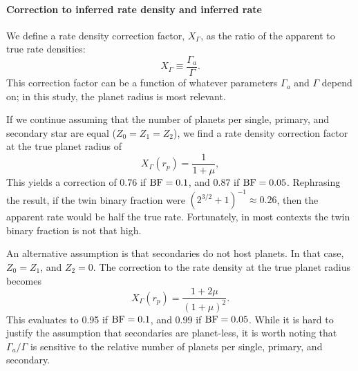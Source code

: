 \paragraph{Correction to inferred rate density and inferred rate}

We define a rate density correction factor, $X_\Gamma$, as the ratio of the 
apparent to true rate densities:
\begin{equation}
X_\Gamma \equiv \frac{\Gamma_a}{\Gamma}.
\end{equation}
This correction factor can be a function of whatever parameters $\Gamma_a$ and 
$\Gamma$ depend on; in this study, the planet radius is most relevant.

If we continue assuming that the number of planets per single, primary, and 
secondary star are equal ($Z_0=Z_1=Z_2$), we find a rate density correction 
factor at the true planet radius of
\begin{equation}
X_\Gamma(r_p) = \frac{1}{1+\mu},
\label{eq:Z_eq_model_1_correction}
\end{equation}
This yields a correction of 0.76 if ${\rm BF}=0.1$, and 0.87 if ${\rm 
BF}=0.05$.
Rephrasing the result, if the twin binary fraction were 
$(2^{3/2}+1)^{-1}\approx 0.26$, then the apparent rate would be half the true 
rate.
Fortunately, in most contexts the twin binary fraction is not that high.

An alternative assumption is that secondaries do not host planets. In that 
case, $Z_0=Z_1$, and $Z_2=0$. The correction to the rate density at the true 
planet radius becomes
\begin{equation}
X_\Gamma(r_p) = \frac{1+2\mu}{(1+\mu)^2}.
\end{equation}
This evaluates to 0.95 if ${\rm BF}=0.1$, and 0.99 if ${\rm BF}=0.05$.
While it is hard to justify the assumption that secondaries are planet-less, 
it is worth noting that $\Gamma_a/\Gamma$ is sensitive to the relative number 
of planets per single, primary, and secondary.